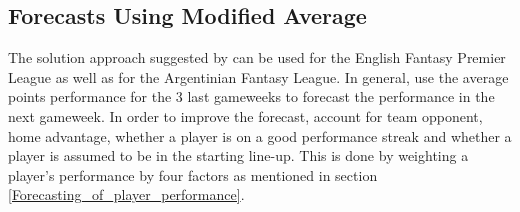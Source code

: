 \subsection{Forecasts Using Modified Average} \label{Sol_approach_Modified_Average}

The solution approach suggested by \cite{Bonomo} can be used for the English Fantasy Premier League as well as for the Argentinian Fantasy League. In general, \cite{Bonomo} use the average points performance for the 3 last gameweeks to forecast the performance in the next gameweek. In order to improve the forecast, \cite{Bonomo} account for team opponent, home advantage, whether a player is on a good performance streak and whether a player is assumed to be in the starting line-up. This is done by weighting a player's performance by four factors as mentioned in section \ref{Forecasting_of_player_performance}.

\newpar


